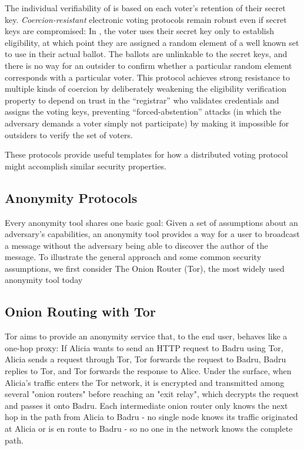     The individual verifiability of \cite{neff_verifiable_2001} is based on each
    voter's retention of their secret key. \emph{Coercion-resistant} electronic
    voting protocols remain robust even if secret keys are compromised: In
    \cite{juels_coercion-resistant_2005}, the voter uses their secret key only
    to establish eligibility, at which point they are assigned a random element
    of a well known set to use in their actual ballot. The ballots are
    unlinkable to the secret keys, and there is no way for an outsider to
    confirm whether a particular random element corresponds with a particular
    voter. This protocol achieves strong resistance to multiple kinds of
    coercion by deliberately weakening the eligibility verification property to
    depend on trust in the ``registrar'' who validates credentials and assigns the
    voting keys, preventing ``forced-abstention'' attacks (in which the adversary
    demands a voter simply not participate) by making it impossible for
    outsiders to verify the set of voters.

    These protocols provide useful templates for how a distributed voting
    protocol might accomplish similar security properties.

\subsection{Anonymity Protocols}
\label{subsection:ExistingAnonymity}
  Every anonymity tool shares one basic goal: Given a set of assumptions about
  an adversary's capabilities, an anonymity tool provides a way for a user to
  broadcast a message without the adversary being able to discover the author of
  the message.
  To illustrate the general approach and some common security assumptions, we
  first consider The Onion Router (Tor), the most widely used anonymity tool
  today\cite{ford_hiding_2014}

  \subsection{Onion Routing with Tor}
  \label{Subsubsection:Tor}
    Tor aims to provide an anonymity service that, to the end user, behaves like
    a one-hop proxy: If Alicia wants to send an HTTP request to Badru using Tor,
    Alicia sends a request through Tor, Tor forwards the request to Badru, Badru
    replies to Tor, and Tor forwards the response to Alice. Under the surface,
    when Alicia's traffic enters the Tor network, it is encrypted and
    transmitted among several "onion routers" before reaching an "exit relay",
    which decrypts the request and passes it onto Badru. Each intermediate onion
    router only knows the next hop in the path from Alicia to Badru - no single
    node knows its traffic originated at Alicia or is en route to Badru - so no
    one in the network knows the complete path.

